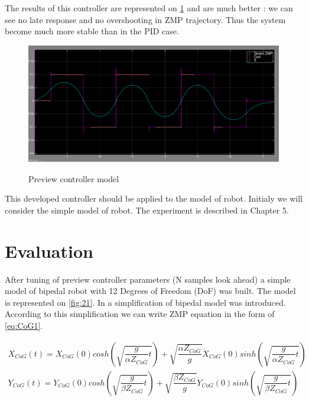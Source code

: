 \documentclass[12pt,a4paper]{report}
\begin{document}
		The results of this controller are represented on \cref{fig:19} and are much better : we can see no late response and no overshooting in ZMP trajectory. Thus the system become much more stable than in the PID case. 
		
		\begin{figure}[h!]
			\vspace{-0.2cm}
			\centering
 			{\includegraphics[width=1\textwidth]{19}}
			\caption{Preview controller model}
			\label{fig:19}
			\vspace{-0.1cm}
		\end{figure}
		
		This developed controller should be applied to the model of robot. Initialy we will consider the simple model of robot. The experiment is described in Chapter 5.
		
	\chapter{Evaluation}
		After tuning of preview controller parameters (N samples look ahead) a simple model of bipedal robot with 12 Degrees of Freedom (DoF) was built. The model is represented on \cref{fig:21}. In \cite{ha2007effective} a simplification of bipedal model was introduced. According to this simplification we can write ZMP equation in the form of \ref{eq:CoG1}.
		
		\begin{equation}\label{eq:CoG1}
			\begin{split}
				X_{CoG}(t) = X_{CoG}(0) cosh(\sqrt{\dfrac{g}{\alpha Z_{CoG}} t}) + \sqrt{\dfrac{\alpha Z_{CoG}}{g}} \dot{X}_{CoG}(0) sinh(\sqrt{\dfrac{g}{\alpha Z_{CoG}} t})\\
				Y_{CoG}(t) = Y_{CoG}(0) cosh(\sqrt{\dfrac{g}{\beta Z_{CoG}} t}) + \sqrt{\dfrac{\beta Z_{CoG}}{g}} \dot{Y}_{CoG}(0) sinh(\sqrt{\dfrac{g}{\beta Z_{CoG}} t})
			\end{split}
		\end{equation}
		
\end{document}
